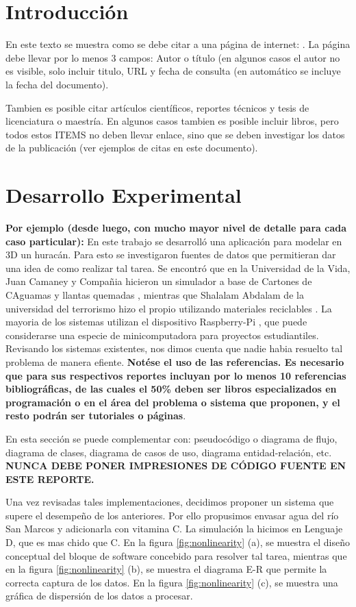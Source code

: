 \documentclass[conference]{IEEEtran}
\begin{document}
\section{Introducción}

En este texto se muestra como se debe citar a una página de internet: \cite{anatohipervisor}. La página debe llevar por lo menos 3 campos: Autor o título (en algunos casos el autor no es visible, solo incluir titulo, URL y fecha de consulta (en automático se incluye la fecha del documento). 

Tambien es posible citar artículos científicos, reportes técnicos y tesis de licenciatura o maestría. En algunos casos tambien es posible incluir libros, pero todos estos ITEMS no deben llevar enlace, sino que se deben investigar los datos de la publicación (ver ejemplos de citas en este documento). 
 
\section{Desarrollo Experimental}

\textbf{Por ejemplo (desde luego, con mucho mayor nivel de detalle para cada caso particular):} En este trabajo se desarrolló una aplicación para modelar en 3D un huracán. Para esto se investigaron fuentes de datos que permitieran dar una idea de como realizar tal tarea. Se encontró que en la Universidad de la Vida, Juan Camaney y Compañia hicieron un simulador a base de Cartones de CAguamas y llantas quemadas \cite{Sh:12}, mientras que Shalalam Abdalam de la universidad del terrorismo hizo el propio utilizando materiales reciclables \cite{mik-05}. La mayoria de los sistemas utilizan el dispositivo Raspberry-Pi \cite{MT-04, mpls}, que puede considerarse una especie de minicomputadora para proyectos estudiantiles. Revisando los sistemas existentes, nos dimos cuenta que nadie habia resuelto tal problema de manera efiente. \textbf{Notése el uso de las referencias. Es necesario que para sus respectivos reportes incluyan por lo menos 10 referencias bibliográficas, de las cuales el 50\% deben ser libros especializados en programación o en el área del problema o sistema que proponen, y el resto podrán ser tutoriales o páginas}.

En esta sección se puede complementar con: pseudocódigo o diagrama de flujo, diagrama de clases, diagrama de casos de uso, diagrama entidad-relación, etc. \textbf{NUNCA DEBE PONER IMPRESIONES DE CÓDIGO FUENTE EN ESTE REPORTE.}

Una vez revisadas tales implementaciones, decidimos proponer un sistema que supere el desempeño de los anteriores. Por ello propusimos envasar agua del río San Marcos y adicionarla con vitamina C. La simulación la hicimos en Lenguaje D, que es mas chido que C. En la figura \ref{fig:nonlinearity} (a), se muestra el diseño conceptual del bloque de software concebido para resolver tal tarea, mientras que en la figura \ref{fig:nonlinearity} (b), se muestra el diagrama E-R que permite la correcta captura de los datos. En la figura \ref{fig:nonlinearity} (c), se muestra una gráfica de dispersión de los datos a procesar. 
\end{document}
